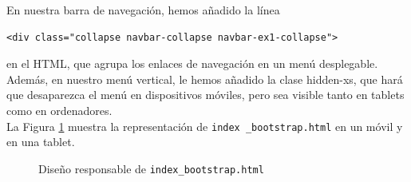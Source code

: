 \documentclass[10pt,a4paper]{article}
\begin{document}
En nuestra barra de navegación, hemos añadido la línea 
\begin{verbatim}
<div class="collapse navbar-collapse navbar-ex1-collapse">
\end{verbatim} 
en el HTML, que agrupa los enlaces de navegación en un menú desplegable.\\

Además, en nuestro menú vertical, le hemos añadido la clase hidden-xs, que hará que desaparezca el menú en dispositivos móviles, pero sea visible tanto en tablets como en ordenadores.\\

La Figura \ref{fig:responsible} muestra la representación de \texttt{index \_bootstrap.html} en un móvil y en una tablet.

\begin{figure}[htbp]
\centering
{}
\caption{Diseño responsable de \texttt{index\_bootstrap.html}} \label{fig:responsible}
\end{figure}
\end{document}
